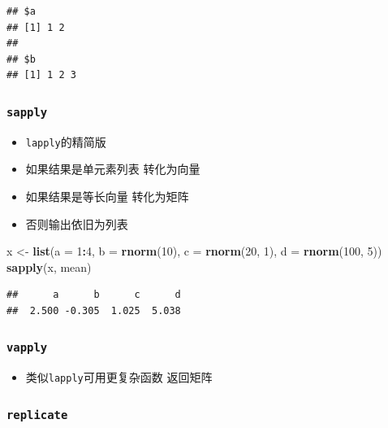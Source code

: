 \documentclass[]{book}
\newenvironment{Shaded}{\begin{snugshade}}{\end{snugshade}}
\newcommand{\DataTypeTok}[1]{\textcolor[rgb]{0.13,0.29,0.53}{#1}}
\newcommand{\DecValTok}[1]{\textcolor[rgb]{0.00,0.00,0.81}{#1}}
\newcommand{\KeywordTok}[1]{\textcolor[rgb]{0.13,0.29,0.53}{\textbf{#1}}}
\newcommand{\NormalTok}[1]{#1}
\newcommand{\OperatorTok}[1]{\textcolor[rgb]{0.81,0.36,0.00}{\textbf{#1}}}
\newcommand{\StringTok}[1]{\textcolor[rgb]{0.31,0.60,0.02}{#1}}
\providecommand{\tightlist}{%
  \setlength{\itemsep}{0pt}\setlength{\parskip}{0pt}}
\begin{document}
\begin{verbatim}
## $a
## [1] 1 2
## 
## $b
## [1] 1 2 3
\end{verbatim}

\hypertarget{sapply}{%
\subsubsection{\texorpdfstring{\texttt{sapply}}{sapply}}\label{sapply}}

\begin{itemize}
\tightlist
\item
  \texttt{lapply}的精简版
\item
  如果结果是单元素列表 转化为向量
\item
  如果结果是等长向量 转化为矩阵
\item
  否则输出依旧为列表
\end{itemize}

\begin{Shaded}
\begin{Highlighting}[]
\NormalTok{x <-}\StringTok{ }\KeywordTok{list}\NormalTok{(}\DataTypeTok{a =} \DecValTok{1}\OperatorTok{:}\DecValTok{4}\NormalTok{, }\DataTypeTok{b =} \KeywordTok{rnorm}\NormalTok{(}\DecValTok{10}\NormalTok{), }\DataTypeTok{c =} \KeywordTok{rnorm}\NormalTok{(}\DecValTok{20}\NormalTok{, }\DecValTok{1}\NormalTok{), }\DataTypeTok{d =} \KeywordTok{rnorm}\NormalTok{(}\DecValTok{100}\NormalTok{, }\DecValTok{5}\NormalTok{))}
\KeywordTok{sapply}\NormalTok{(x, mean)}
\end{Highlighting}
\end{Shaded}

\begin{verbatim}
##      a      b      c      d 
##  2.500 -0.305  1.025  5.038
\end{verbatim}

\hypertarget{vapply}{%
\subsubsection{\texorpdfstring{\texttt{vapply}}{vapply}}\label{vapply}}

\begin{itemize}
\tightlist
\item
  类似\texttt{lapply}可用更复杂函数 返回矩阵
\end{itemize}

\hypertarget{replicate}{%
\subsubsection{\texorpdfstring{\texttt{replicate}}{replicate}}\label{replicate}}
\end{document}
